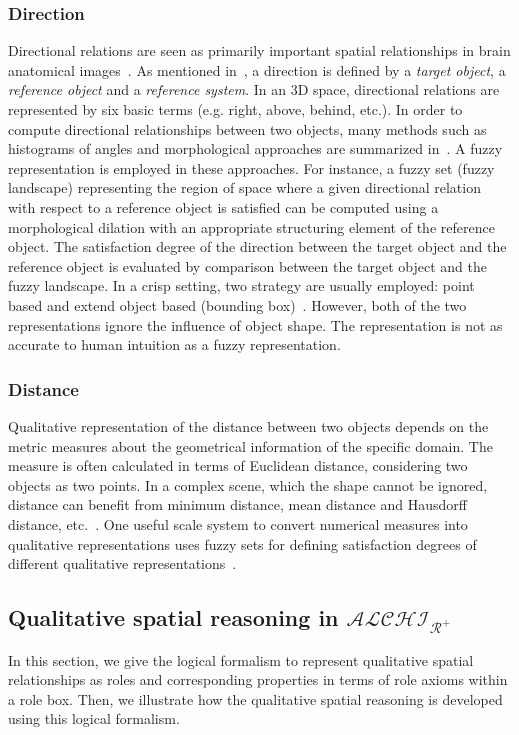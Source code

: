 \documentclass{article}
\begin{document}
\subsubsection{Direction}
Directional relations are seen as primarily important spatial relationships in brain anatomical images~\cite{Bloch2005fuzzy,fouquier2012sequential,Hudelot2008fuzzy,nempont2013constraint}.
As mentioned in~\cite{Bloch2005fuzzy}, a direction is defined by a \textit{target object}, a \textit{reference object} and a \textit{reference system}.
In an 3D space, directional relations are represented by six basic terms (e.g. right, above, behind, etc.).
In order to compute directional relationships between two objects, many methods such as histograms of angles and morphological approaches are summarized in~\cite{Bloch2005fuzzy}.
A fuzzy representation is employed in these approaches. 
For instance, a fuzzy set (fuzzy landscape) representing the region of space where a given directional relation with respect to a reference object is satisfied 
can be computed using a morphological dilation with an appropriate structuring element of the reference object.
The satisfaction degree of the direction between the target object and the reference object is evaluated by comparison between the target object and the fuzzy landscape.
In a crisp setting, two strategy are usually employed: point based and extend object based (bounding box)~\cite{chen2013survey}.
However, both of the two representations ignore the influence of object shape. The representation is not as accurate to human intuition as a fuzzy representation.
\subsubsection{Distance}
Qualitative representation of the distance between two objects depends on the metric measures about the geometrical information of the specific domain.
The measure is often calculated in terms of Euclidean distance, considering two objects as two points. In a complex scene, which the shape cannot be ignored,
distance can benefit from minimum distance, mean distance and Hausdorff distance, etc.~\cite{Bloch2005fuzzy}. One useful scale system to convert numerical measures into 
qualitative representations uses fuzzy sets for defining satisfaction degrees of different qualitative representations~\cite{Bloch2005fuzzy}.

\subsection{Qualitative spatial reasoning in $\mathcal{ALCHI_{R^+}}$}
In this section, we give the logical formalism to represent qualitative spatial relationships as roles and  corresponding properties in terms of role axioms within a role box.
Then, we illustrate how the qualitative spatial reasoning is developed using this logical formalism. 
\end{document}
